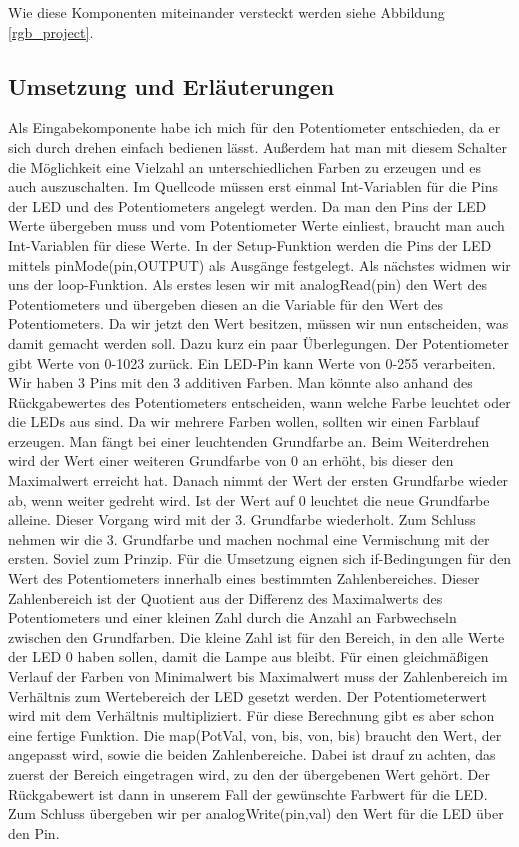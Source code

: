 Wie diese Komponenten miteinander versteckt werden siehe Abbildung \ref{rgb_project}.

\subsection{Umsetzung und Erläuterungen}
Als Eingabekomponente habe ich mich für den Potentiometer entschieden, da er sich durch drehen einfach bedienen lässt. Außerdem hat man mit diesem Schalter die Möglichkeit eine Vielzahl an unterschiedlichen Farben zu erzeugen und es auch auszuschalten. 
Im Quellcode müssen erst einmal Int-Variablen für die Pins der LED und des Potentiometers angelegt werden. Da man den Pins der LED Werte übergeben muss und vom Potentiometer Werte einliest, braucht man auch Int-Variablen für diese Werte.
In der Setup-Funktion werden die Pins der LED mittels pinMode(pin,OUTPUT) als Ausgänge festgelegt.
Als nächstes widmen wir uns der loop-Funktion. Als erstes lesen wir mit analogRead(pin) den Wert des Potentiometers und übergeben diesen an die Variable für den Wert des Potentiometers.
Da wir jetzt den Wert besitzen, müssen wir nun entscheiden, was damit gemacht werden soll. Dazu kurz ein paar Überlegungen. Der Potentiometer gibt Werte von 0-1023 zurück. Ein LED-Pin kann Werte von 0-255 verarbeiten. Wir haben 3 Pins mit den 3 additiven Farben. Man könnte also anhand des Rückgabewertes des Potentiometers entscheiden, wann welche Farbe leuchtet oder die LEDs aus sind. Da wir mehrere Farben wollen, sollten wir einen Farblauf erzeugen. Man fängt bei einer leuchtenden Grundfarbe an. Beim Weiterdrehen wird der Wert einer weiteren Grundfarbe von 0 an erhöht, bis dieser den Maximalwert erreicht hat. Danach nimmt der Wert der ersten Grundfarbe wieder ab, wenn weiter gedreht wird. Ist der Wert auf 0 leuchtet die neue Grundfarbe alleine. Dieser Vorgang wird mit der 3. Grundfarbe wiederholt. Zum Schluss nehmen wir die 3. Grundfarbe und machen nochmal eine Vermischung mit der ersten.
Soviel zum Prinzip. Für die Umsetzung eignen sich if-Bedingungen für den Wert des Potentiometers innerhalb eines bestimmten Zahlenbereiches. Dieser Zahlenbereich ist der Quotient aus der Differenz des Maximalwerts des Potentiometers und einer kleinen Zahl durch die Anzahl an Farbwechseln zwischen den Grundfarben. Die kleine Zahl ist für den Bereich, in den alle Werte der LED 0 haben sollen, damit die Lampe aus bleibt. Für einen gleichmäßigen Verlauf der Farben von Minimalwert bis Maximalwert muss der Zahlenbereich im Verhältnis zum Wertebereich der LED gesetzt werden. Der Potentiometerwert wird mit dem Verhältnis multipliziert. Für diese Berechnung gibt es aber schon eine fertige Funktion. Die map(PotVal, von, bis, von, bis) braucht den Wert, der angepasst wird, sowie die beiden Zahlenbereiche. Dabei ist drauf zu achten, das zuerst der Bereich eingetragen wird, zu den der übergebenen Wert gehört. Der Rückgabewert ist dann in unserem Fall der gewünschte Farbwert für die LED.
Zum Schluss übergeben wir per analogWrite(pin,val) den Wert für die LED über den Pin. 


